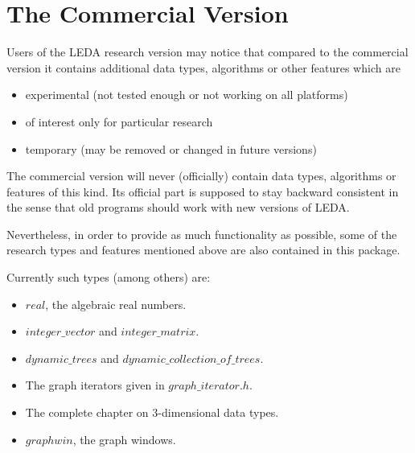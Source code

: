 \chapter*{The Commercial Version}
\label{The Commercial Version}

Users of the LEDA research version 
may  notice that compared to the commercial version
it contains additional data types, algorithms or other features which are 

\begin{itemize}
\item
experimental (not tested enough or not working on all platforms)
\item
of interest only for particular research
\item
temporary (may be removed or changed in future versions)
\end{itemize}

The commercial version  will never (officially) contain data types, algorithms or 
features of this kind. Its official part is supposed to stay backward consistent in 
the sense that old programs should work with new versions of LEDA. 

\bigskip\noindent
Nevertheless, in order to provide as much functionality as possible, some of the
research types and features mentioned above are also contained in this package. 

\bigskip\noindent
Currently such types (among others) are:

\begin{itemize}

\item
$real$, the algebraic real numbers.

\item
$integer\_vector$ and $integer\_matrix$.

\item
$dynamic\_trees$ and $dynamic\_collection\_of\_trees$.

\item
The graph iterators given in $graph\_iterator.h$.

\item
The complete chapter on 3-dimensional data types.

\item
$graphwin$, the graph windows.
\end{itemize}

